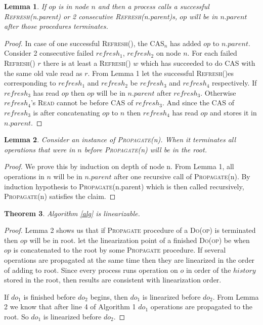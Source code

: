 \documentclass[10pt]{article}
\newtheorem{theorem}{Theorem}
\newtheorem{lemma}[theorem]{Lemma}
\theoremstyle{definition}
\begin{document}
\begin{lemma}
  If $op$ is in node $n$ and then a process calls a successful \textsc{Refresh(}\textnormal{n.parent}\textsc{)} or 2 consecutive \textsc{Refresh(}\textnormal{n.parent}\textsc{)}s, $op$ will be in $n.parent$ after those procedures terminates.
\end{lemma}
\begin{proof}
In case of one successful \textsc{Refresh()}, the \textsc{CAS}$_n$ has added $op$ to $n.parent$.
Consider 2 consecutive failed $refresh_1$, $refresh_2$ on node $n$. For each failed \textsc{Refresh()} $r$ there is at least a \textsc{Refresh()} $w$ which has succeeded to do \textsc{CAS} with the same old vale read as $r$.
From Lemma 1 let the successful \textsc{Refresh()}es corresponding to $refresh_1$ and $refresh_2$ be $refresh_3$ and $refresh_4$ respectively.
If $refresh_3$ has read $op$ then $op$ will be in $n.parent$ after $refresh_3$. Otherwise $refresh_4$'s \textsc{Read} cannot be before \textsc{CAS} of $refresh_3$.
And since the \textsc{CAS} of $refresh_3$ is after concatenating $op$ to $n$ then $refresh_4$ has read $op$ and stores it in $n.parent$.
\end{proof}

\begin{lemma}
  Consider an instance of \textsc{Propagate(}\textnormal{n}\textsc{)}. When it terminates all operations that were in $n$ before \textsc{Propagate(}\textnormal{n}\textsc{)} will be in the root.
\end{lemma}
\begin{proof}
  We prove this by induction on depth of node n. From Lemma 1, all operations in $n$ will be in $n.parent$ after one recursive call of \textsc{Propagate(}\textnormal{n}\textsc{)}. By induction hypothesis to \textsc{Propagate(}\textnormal{n.parent}\textsc{)}  which is then called recursively, \textsc{Propagate(}\textnormal{n}\textsc{)} satisfies the claim.
\end{proof}

\begin{theorem}
Algorithm \ref{alg} is linearizable.  
\end{theorem}
\begin{proof}
   Lemma 2 shows us that if \textsc{Propagate} procedure of a \textsc{Do(\textnormal{op})} is terminated then $op$ will be in root. let the linearization point of a finished \textsc{Do(\textnormal{op})} be when $op$ is  concatenated to the root by some \textsc{Propagate} procedure. If several operations are propagated at the same time then they are linearized in the order of adding to root. Since every process runs operation on  $o$ in order of the $history$ stored in the root, then results are consistent with linearization order. 
  
  If $do_1$ is finished before $do_2$ begins, then $do_1$ is linearized before $do_2$.
  From Lemma 2 we know that after line 4 of Algorithm 1 $do_1$ operations are propagated to the root. So $do_1$ is linearized before $do_2$.
\end{proof}
\end{document}
